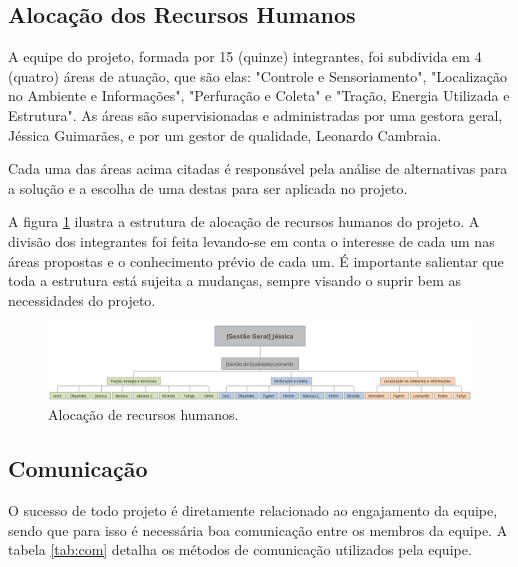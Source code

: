     \subsection{Alocação dos Recursos Humanos}

      A equipe do projeto, formada por 15 (quinze) integrantes, foi
      subdivida em 4 (quatro) áreas de atuação, que são elas: "Controle
      e Sensoriamento", "Localização no Ambiente e Informações", "Perfuração
      e Coleta" e "Tração, Energia Utilizada e Estrutura". As áreas são
      supervisionadas e administradas por uma gestora geral, Jéssica Guimarães,
      e por um gestor de qualidade, Leonardo Cambraia.

      Cada uma das áreas acima citadas é responsável pela análise de alternativas
      para a solução e a escolha de uma destas para ser aplicada no projeto.

      A figura \ref{fig:aloc} ilustra a estrutura de alocação de recursos humanos do
      projeto. A divisão dos integrantes foi feita levando-se em conta o
      interesse de cada um nas áreas propostas e o conhecimento prévio de
      cada um. É importante salientar que toda a estrutura está sujeita a
      mudanças, sempre visando o suprir bem as necessidades do projeto.

      \begin{figure}[!htbp]
      \begin{center}
      \includegraphics[width=\textwidth]{figuras/alocacao.eps}
      \caption{\label{fig:aloc}Alocação de recursos humanos.}
      \end{center}
      \end{figure}

    \subsection{Comunicação}

      O sucesso de todo projeto é diretamente relacionado ao engajamento
      da equipe, sendo que para isso é necessária boa comunicação entre os
      membros da equipe. A tabela \ref{tab:com} detalha os métodos de comunicação
      utilizados pela equipe.

